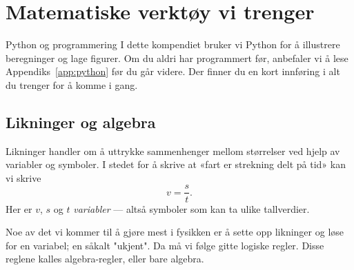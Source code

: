 \chapter{Matematiske verktøy vi trenger}
\label{Chapter:matematikk}

\begin{mymerk*}{Python og programmering}
I dette kompendiet bruker vi Python for å illustrere beregninger og lage figurer. Om du aldri har programmert før, anbefaler vi å lese Appendiks~\ref{app:python} før du går videre. Der finner du en kort innføring i alt du trenger for å komme i gang.
\end{mymerk*}

\section{Likninger og algebra}

Likninger handler om å uttrykke sammenhenger mellom størrelser ved hjelp av variabler og symboler. I stedet for å skrive at «fart er strekning delt på tid» kan vi skrive
\[
v = \frac{s}{t}.
\]
Her er $v$, $s$ og $t$ \emph{variabler} — altså symboler som kan ta ulike tallverdier. 

Noe av det vi kommer til å gjøre mest i fysikken er å sette opp likninger og løse for en variabel; en såkalt "ukjent". Da må vi følge gitte logiske regler. Disse reglene kalles algebra-regler, eller bare algebra.

